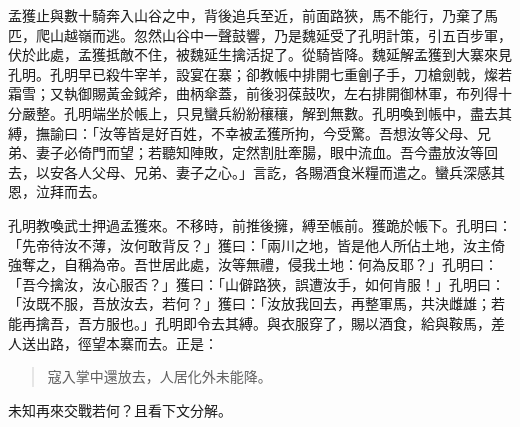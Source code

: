 孟獲止與數十騎奔入山谷之中，背後追兵至近，前面路狹，馬不能行，乃棄了馬匹，爬山越嶺而逃。忽然山谷中一聲鼓響，乃是魏延受了孔明計策，引五百步軍，伏於此處，孟獲抵敵不住，被魏延生擒活捉了。從騎皆降。魏延解孟獲到大寨來見孔明。孔明早已殺牛宰羊，設宴在寨；卻教帳中排開七重劊子手，刀槍劍戟，燦若霜雪；又執御賜黃金鉞斧，曲柄傘蓋，前後羽葆鼓吹，左右排開御林軍，布列得十分嚴整。孔明端坐於帳上，只見蠻兵紛紛穰穰，解到無數。孔明喚到帳中，盡去其縛，撫諭曰：「汝等皆是好百姓，不幸被孟獲所拘，今受驚。吾想汝等父母、兄弟、妻子必倚門而望；若聽知陣敗，定然割肚牽腸，眼中流血。吾今盡放汝等回去，以安各人父母、兄弟、妻子之心。」言訖，各賜酒食米糧而遣之。蠻兵深感其恩，泣拜而去。

孔明教喚武士押過孟獲來。不移時，前推後擁，縛至帳前。獲跪於帳下。孔明曰：「先帝待汝不薄，汝何敢背反？」獲曰：「兩川之地，皆是他人所佔土地，汝主倚強奪之，自稱為帝。吾世居此處，汝等無禮，侵我土地：何為反耶？」孔明曰：「吾今擒汝，汝心服否？」獲曰：「山僻路狹，誤遭汝手，如何肯服！」孔明曰：「汝既不服，吾放汝去，若何？」獲曰：「汝放我回去，再整軍馬，共決雌雄；若能再擒吾，吾方服也。」孔明即令去其縛。與衣服穿了，賜以酒食，給與鞍馬，差人送出路，徑望本寨而去。正是：

\begin{quote}
寇入掌中還放去，人居化外未能降。
\end{quote}

未知再來交戰若何？且看下文分解。
